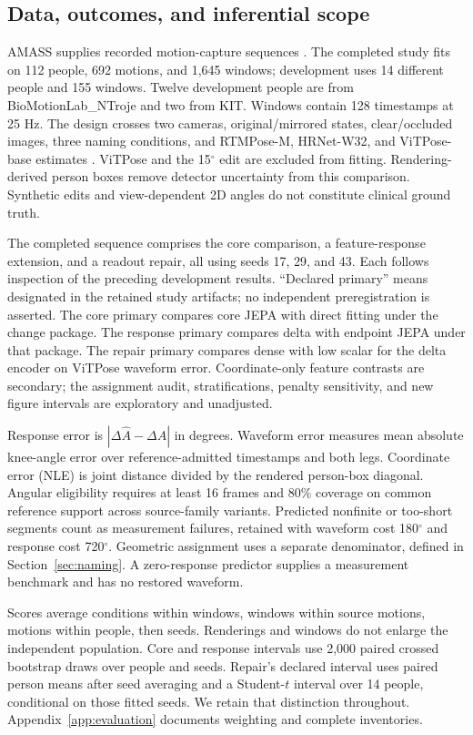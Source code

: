 \documentclass{article}
\newcommand{\dg}{^{\circ}}
\begin{document}
\subsection{Data, outcomes, and inferential scope}
AMASS supplies recorded motion-capture sequences \citep{mahmood2019amass}. The completed study fits on 112 people, 692 motions, and 1,645 windows; development uses 14 different people and 155 windows. Twelve development people are from BioMotionLab\_NTroje and two from KIT. Windows contain 128 timestamps at 25 Hz. The design crosses two cameras, original/mirrored states, clear/occluded images, three naming conditions, and RTMPose-M, HRNet-W32, and ViTPose-base estimates \citep{jiang2023rtmpose,sun2019hrnet,xu2022vitpose}. ViTPose and the 15$\dg$ edit are excluded from fitting. Rendering-derived person boxes remove detector uncertainty from this comparison. Synthetic edits and view-dependent 2D angles do not constitute clinical ground truth.

The completed sequence comprises the core comparison, a feature-response extension, and a readout repair, all using seeds 17, 29, and 43. Each follows inspection of the preceding development results. ``Declared primary'' means designated in the retained study artifacts; no independent preregistration is asserted. The core primary compares core JEPA with direct fitting under the change package. The response primary compares delta with endpoint JEPA under that package. The repair primary compares dense with low scalar for the delta encoder on ViTPose waveform error. Coordinate-only feature contrasts are secondary; the assignment audit, stratifications, penalty sensitivity, and new figure intervals are exploratory and unadjusted.

Response error is $|\Delta\widehat A-\Delta A|$ in degrees. Waveform error measures mean absolute knee-angle error over reference-admitted timestamps and both legs. Coordinate error (NLE) is joint distance divided by the rendered person-box diagonal. Angular eligibility requires at least 16 frames and 80\% coverage on common reference support across source-family variants. Predicted nonfinite or too-short segments count as measurement failures, retained with waveform cost 180$\dg$ and response cost 720$\dg$. Geometric assignment uses a separate denominator, defined in Section~\ref{sec:naming}. A zero-response predictor supplies a measurement benchmark and has no restored waveform.

Scores average conditions within windows, windows within source motions, motions within people, then seeds. Renderings and windows do not enlarge the independent population. Core and response intervals use 2,000 paired crossed bootstrap draws over people and seeds. Repair's declared interval uses paired person means after seed averaging and a Student-$t$ interval over 14 people, conditional on those fitted seeds. We retain that distinction throughout. Appendix~\ref{app:evaluation} documents weighting and complete inventories.
\end{document}
